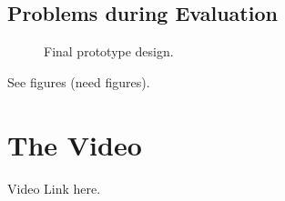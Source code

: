 \documentclass{article}
\begin{document}
\subsection{Problems during Evaluation}

\begin{figure}
\centering
\vspace{-50mm}
\caption{Final prototype design.}
\label{fig:ffp}
\end{figure}


See figures (need figures).
\section{The Video}

Video Link here.

\end{document}
